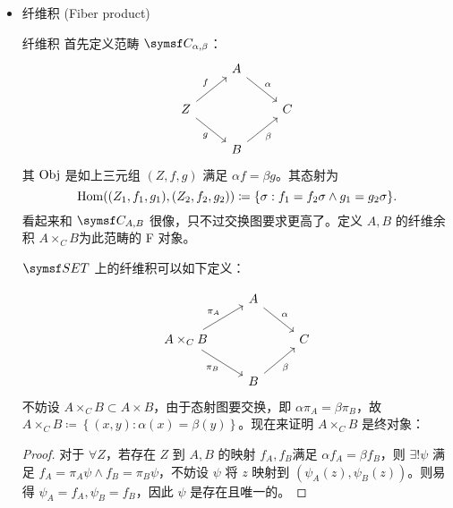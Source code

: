 \begin{itemize}
    \item 纤维积 (Fiber product)

          \begin{defi}{纤维积}
              首先定义范畴 \(\symsf C_{\alpha, \beta }\)：
              \[
                  \begin{tikzcd}
                      {}                               & A\arrow[rd, "\alpha "] & {} \\
                      Z\arrow[ru, "f"]\arrow[rd, "g"'] & {}                     & C  \\
                      {}                               & B\arrow[ru, "\beta"' ] & {}
                  \end{tikzcd}
              \]
              其 \(\operatorname{Obj}\) 是如上三元组 \((Z,f,g)\) 满足 \(\alpha f=\beta g\)。其态射为
              \[
                  \Hom((Z_1,f_1,g_1),(Z_2,f_2,g_2)) \coloneqq \left\{ \sigma : f_1=f_2\sigma \land  g_1=g_2\sigma\right\}
                  .\]
              看起来和 \(\symsf C_{A,B}\) 很像，只不过交换图要求更高了。定义 \(A,B\) 的纤维余积 \(A \times _C B\)为此范畴的 F 对象。
          \end{defi}

          \(\SET\) 上的纤维积可以如下定义：

          \[
              \begin{tikzcd}
                  {}                                                     & A\arrow[rd, "\alpha "] & {} \\
                  A \times _C B\arrow[ru, "\pi _A"]\arrow[rd, "\pi _B"'] & {}                     & C  \\
                  {}                                                     & B\arrow[ru, "\beta" '] & {}
              \end{tikzcd}
          \]
          不妨设 \(A\times _CB\subset A\times B\)，由于态射图要交换，即 \(\alpha \pi _A=\beta \pi _B\)，故 \(A\times _CB\coloneqq \left\{ (x,y) : \alpha (x)  = \beta (y)\right\} \)。现在来证明 \(A\times _CB\) 是终对象：
          \begin{proof}{}
              对于 \(\forall Z\)，若存在 \(Z\) 到 \(A,B\) 的映射 \(f_A,f_B\)满足 \(\alpha f_A=\beta f_B\)，则 \(\exists !\psi \) 满足 \(f_A = \pi _A \psi \land f_B = \pi _B \psi  \)，不妨设 \(\psi \) 将 \(z\) 映射到 \((\psi _A(z),\psi _B(z))\)。则易得 \(\psi _A=f_A,\psi _B=f_B\)，因此 \(\psi \) 是存在且唯一的。
          \end{proof}


\end{itemize}
